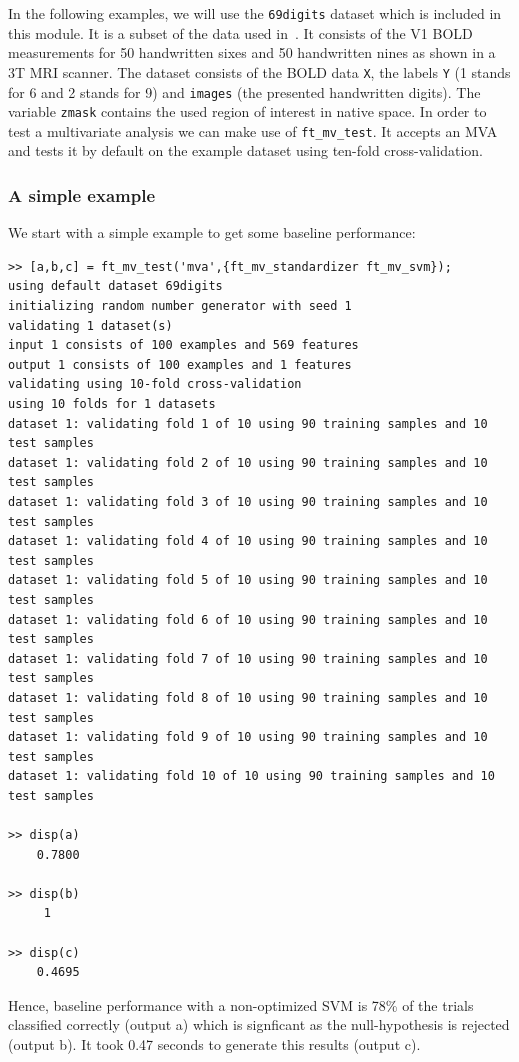 \documentclass{article}
\renewcommand{\t}[1]{{\tt #1}}
\begin{document}
In the following examples, we will use the \t{69digits} dataset which is included in this module. It is a subset of the data used in~\cite{gerven2010,gerven2010a}. It consists of the V1 BOLD measurements for 50 handwritten sixes and 50 handwritten nines as shown in a 3T MRI scanner. The dataset consists of the BOLD data \t{X}, the labels \t{Y} (1 stands for 6 and 2 stands for 9) and \t{images} (the presented handwritten digits). The variable \t{zmask} contains the used region of interest in native space. In order to test a multivariate analysis we can make use of \t{ft\_mv\_test}. It accepts an MVA and tests it by default on the example dataset using ten-fold cross-validation.

\subsubsection*{A simple example}
We start with a simple example to get some baseline performance:
\begin{verbatim}
>> [a,b,c] = ft_mv_test('mva',{ft_mv_standardizer ft_mv_svm});
using default dataset 69digits
initializing random number generator with seed 1
validating 1 dataset(s)
input 1 consists of 100 examples and 569 features
output 1 consists of 100 examples and 1 features
validating using 10-fold cross-validation
using 10 folds for 1 datasets
dataset 1: validating fold 1 of 10 using 90 training samples and 10 test samples
dataset 1: validating fold 2 of 10 using 90 training samples and 10 test samples
dataset 1: validating fold 3 of 10 using 90 training samples and 10 test samples
dataset 1: validating fold 4 of 10 using 90 training samples and 10 test samples
dataset 1: validating fold 5 of 10 using 90 training samples and 10 test samples
dataset 1: validating fold 6 of 10 using 90 training samples and 10 test samples
dataset 1: validating fold 7 of 10 using 90 training samples and 10 test samples
dataset 1: validating fold 8 of 10 using 90 training samples and 10 test samples
dataset 1: validating fold 9 of 10 using 90 training samples and 10 test samples
dataset 1: validating fold 10 of 10 using 90 training samples and 10 test samples

>> disp(a)
    0.7800

>> disp(b)
     1

>> disp(c)
    0.4695    
\end{verbatim}
Hence, baseline performance with a non-optimized SVM is 78\% of the trials classified correctly (output a) which is signficant as the null-hypothesis is rejected (output b). It took 0.47 seconds to generate this results (output c).
\end{document}
